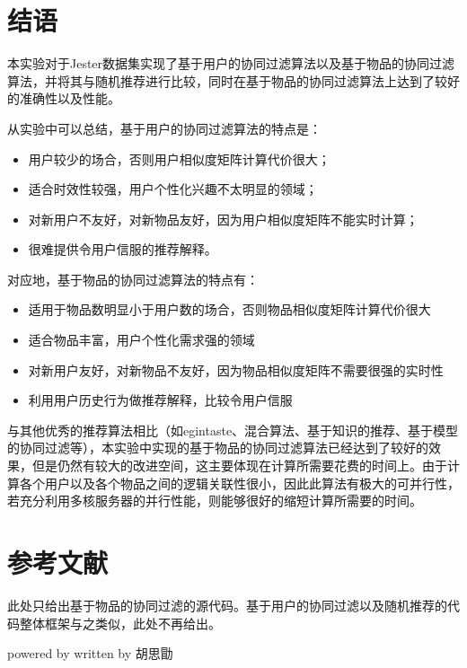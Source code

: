 \documentclass{article}
\begin{document}
\section{结语}
\label{sec:jie_yu_}
\par 本实验对于Jester数据集实现了基于用户的协同过滤算法以及基于物品的协同过滤算法，并将其与随机推荐进行比较，同时在基于物品的协同过滤算法上达到了较好的准确性以及性能。
\par 从实验中可以总结，基于用户的协同过滤算法的特点是：
\begin{itemize}
    \item 用户较少的场合，否则用户相似度矩阵计算代价很大；
    \item 适合时效性较强，用户个性化兴趣不太明显的领域；
    \item 对新用户不友好，对新物品友好，因为用户相似度矩阵不能实时计算；
    \item 很难提供令用户信服的推荐解释。
\end{itemize}
对应地，基于物品的协同过滤算法的特点有：
\begin{itemize}
    \item 适用于物品数明显小于用户数的场合，否则物品相似度矩阵计算代价很大
    \item 适合物品丰富，用户个性化需求强的领域
    \item 对新用户友好，对新物品不友好，因为物品相似度矩阵不需要很强的实时性
    \item 利用用户历史行为做推荐解释，比较令用户信服
\end{itemize}
\par 与其他优秀的推荐算法相比（如egintaste、混合算法、基于知识的推荐、基于模型的协同过滤等），本实验中实现的基于物品的协同过滤算法已经达到了较好的效果，但是仍然有较大的改进空间，这主要体现在计算所需要花费的时间上。由于计算各个用户以及各个物品之间的逻辑关联性很小，因此此算法有极大的可并行性，若充分利用多核服务器的并行性能，则能够很好的缩短计算所需要的时间。

\appendix
\section{参考文献}
\label{sec:can_kao_wen_xian_}

\begingroup
\renewcommand{\section}[2]{}%
\nocite{*}


\endgroup

\section{源代码}
\par 此处只给出基于物品的协同过滤的源代码。基于用户的协同过滤以及随机推荐的代码整体框架与之类似，此处不再给出。


\vfill
{\tiny powered by \XeLaTeX \hfill written by 胡思勖}
\end{document}
